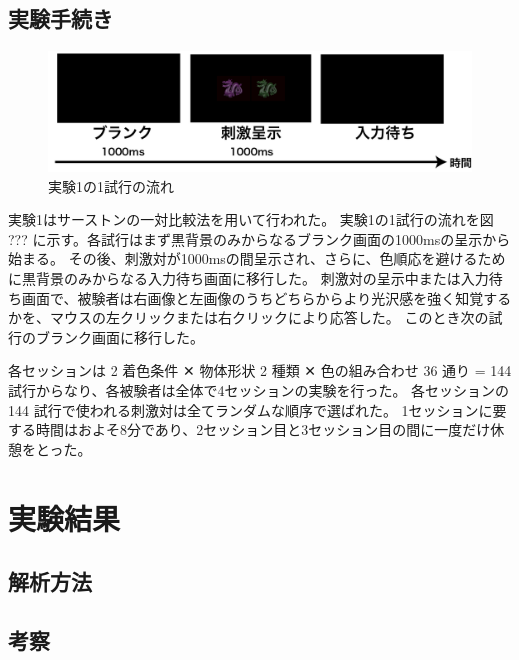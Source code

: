    \subsection{実験手続き}

        \begin{figure}[h]
            \centering
            \includegraphics[width=14.0cm]{./img/ex1_procedure.png}
            \caption{実験1の1試行の流れ}
            \label{ex1_procedure}
        \end{figure}

        実験1はサーストンの一対比較法を用いて行われた。
        実験1の1試行の流れを図 ??? に示す。各試行はまず黒背景のみからなるブランク画面の1000msの呈示から始まる。
        その後、刺激対が1000msの間呈示され、さらに、色順応を避けるために黒背景のみからなる入力待ち画面に移行した。
        刺激対の呈示中または入力待ち画面で、被験者は右画像と左画像のうちどちらからより光沢感を強く知覚するかを、マウスの左クリックまたは右クリックにより応答した。
        このとき次の試行のブランク画面に移行した。

        各セッションは 2 着色条件 ✕ 物体形状 2 種類 ✕ 色の組み合わせ 36 通り = 144 試行からなり、各被験者は全体で4セッションの実験を行った。
        各セッションの 144 試行で使われる刺激対は全てランダムな順序で選ばれた。
        1セッションに要する時間はおよそ8分であり、2セッション目と3セッション目の間に一度だけ休憩をとった。



\section{実験結果}
    \subsection{解析方法}

    \subsection{考察}
        
